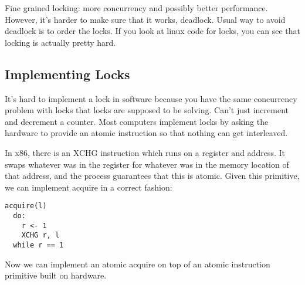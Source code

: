 \documentclass[psamsfonts]{amsart}
\begin{document}
Fine grained locking: more concurrency and possibly better performance. However, it's harder to make sure that it works, deadlock. Usual way to avoid deadlock is to order the locks. If you look at linux code for locks, you can see that locking is actually pretty hard.

\subsection{Implementing Locks}

It's hard to implement a lock in software because you have the same concurrency problem with locks that locks are supposed to be solving. Can't just increment and decrement a counter. Most computers implement locks by asking the hardware to provide an atomic instruction so that nothing can get interleaved.

In x86, there is an XCHG instruction which runs on a register and address. It swaps whatever was in the register for whatever was in the memory location of that address, and the process guarantees that this is atomic. Given this primitive, we can implement acquire in a correct fashion:

\begin{verbatim}
acquire(l)
  do:
    r <- 1
    XCHG r, l
  while r == 1
\end{verbatim}

Now we can implement an atomic acquire on top of an atomic instruction primitive built on hardware.
\end{document}
